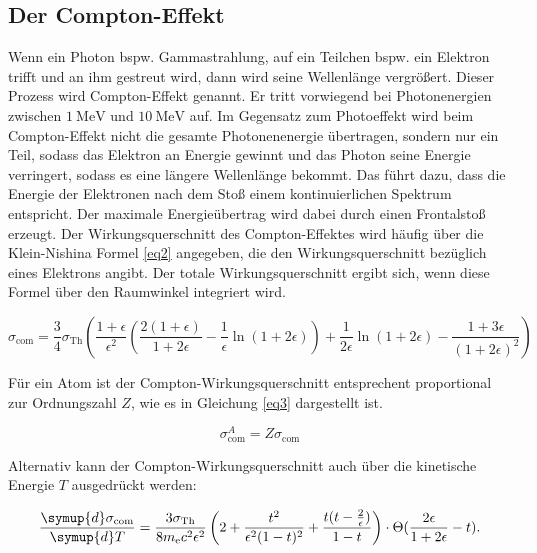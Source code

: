 \subsection{Der Compton-Effekt}
Wenn ein Photon bspw. Gammastrahlung, auf ein Teilchen bspw. ein Elektron trifft
und an ihm gestreut wird, dann wird seine Wellenlänge vergrößert. 
Dieser Prozess wird Compton-Effekt genannt.
Er tritt vorwiegend bei Photonenergien zwischen $\SI{1}{\mega\electronvolt}$ und 
$\SI{10}{\mega\electronvolt}$ auf.
Im Gegensatz zum Photoeffekt wird beim Compton-Effekt nicht die 
gesamte Photonenenergie übertragen, sondern nur ein Teil, sodass das Elektron an 
Energie gewinnt und das Photon seine Energie verringert, sodass es eine längere 
Wellenlänge bekommt. Das führt dazu, dass die Energie der Elektronen nach dem 
Stoß einem kontinuierlichen Spektrum entspricht.
Der maximale Energieübertrag wird dabei durch einen Frontalstoß erzeugt.
Der Wirkungsquerschnitt des Compton-Effektes wird häufig über die 
Klein-Nishina Formel \ref{eq2} angegeben, die den Wirkungsquerschnitt bezüglich 
eines Elektrons angibt. Der totale Wirkungsquerschnitt ergibt sich, wenn diese 
Formel über den Raumwinkel integriert wird.

\begin{equation}
    \sigma_{\text{com}} = \frac{3}{4}\sigma_{\text{Th}} \left(\frac{1 + \epsilon}{\epsilon^2} \left(\frac{2(1+\epsilon)}{1+2\epsilon} - \frac{1}{\epsilon} \ln(1+2\epsilon) \right) + \frac{1}{2\epsilon} \ln(1+2\epsilon) - \frac{1+3\epsilon}{(1+2\epsilon)^2} \right)
    \label{eq2}
\end{equation}

Für ein Atom ist der Compton-Wirkungsquerschnitt entsprechent proportional zur 
Ordnungszahl $Z$, wie es in Gleichung \eqref{eq3} dargestellt ist.

\begin{equation}
    \sigma^A_{\text{com}} = Z \sigma_{\text{com}}
    \label{eq3}
\end{equation}

Alternativ kann der Compton-Wirkungsquerschnitt auch über die kinetische 
Energie $T$ ausgedrückt werden:

\begin{equation}
    \frac{\symup{d} \sigma_{\text{com}}}{\symup{d}T} = \frac{3\sigma_{\text{Th}}}{8 m_{\text{e}} c^2 \epsilon^2} \left(2+ \frac{t^2}{\epsilon^2(1-t)^2} + \frac{t(t-\frac{2}{\epsilon})}{1-t} \right) \cdot \Theta( \frac{2 \epsilon}{1+ 2 \epsilon}-t).
    \label{2.12}
\end{equation}

